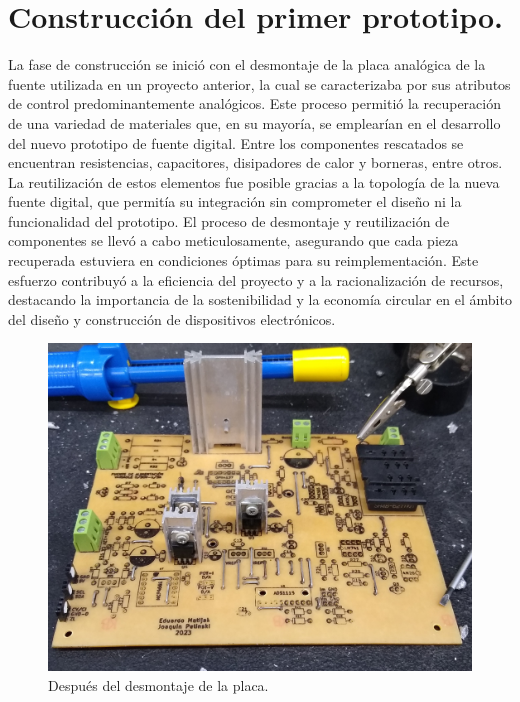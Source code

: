 \section{Construcción del primer prototipo.}
La fase de construcción se inició con el desmontaje de la placa analógica de la fuente utilizada en un proyecto anterior, la cual se caracterizaba por sus atributos de control predominantemente analógicos. Este proceso permitió la recuperación de una variedad de materiales que, en su mayoría, se emplearían en el desarrollo del nuevo prototipo de fuente digital. Entre los componentes rescatados se encuentran resistencias, capacitores, disipadores de calor y borneras, entre otros. La reutilización de estos elementos fue posible gracias a la topología de la nueva fuente digital, que permitía su integración sin comprometer el diseño ni la funcionalidad del prototipo. 
El proceso de desmontaje y reutilización de componentes se llevó a cabo meticulosamente, asegurando que cada pieza recuperada estuviera en condiciones óptimas para su reimplementación. Este esfuerzo contribuyó a la eficiencia del proyecto y a la racionalización de recursos, destacando la importancia de la sostenibilidad y la economía circular en el ámbito del diseño y construcción de dispositivos electrónicos.

\begin{figure}[H]
    \centering
    \includegraphics[scale=0.1]{./imagenes/fotos/desmontada.jpg}
    \caption{Después del desmontaje de la placa.}
    \label{F:desmontaje_de_la_placa}
\end{figure}

